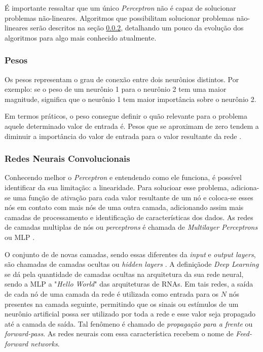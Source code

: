 É importante ressaltar que um único \textit{Perceptron} não é capaz de solucionar problemas não-lineares. Algoritmos que possibilitam solucionar problemas não-lineares serão descritos na seção \ref{sssec:cnn}, detalhando um pouco da evolução dos algoritmos para algo mais conhecido atualmente.

\subsubsection{Pesos}

Os pesos representam o grau de conexão entre dois neurônios distintos. Por exemplo: se o peso de um neurônio 1 para o neurônio 2 tem uma maior magnitude, significa que o neurônio 1 tem maior importância sobre o neurônio 2.

Em termos práticos, o peso consegue definir o quão relevante para o problema aquele determinado valor de entrada é. Pesos que se aproximam de zero tendem a diminuir a importância do valor de entrada para o valor resultante da rede \cite{everything-about-nn}.

\subsubsection{Redes Neurais Convolucionais} \label{sssec:cnn}

Conhecendo melhor o \textit{Perceptron} e entendendo como ele funciona, é possível identificar da sua limitação: a linearidade. Para solucioar esse problema, adiciona-se uma função de ativação para cada valor resultante de um nó e coloca-se esses nós em contato com mais nós de uma outra camada, adicionando assim mais camadas de processamento e identificação de características dos dados. As redes de camadas multiplas de nós ou \textit{perceptrons} é chamada de \textit{Multilayer Perceptrons} ou MLP \cite{deep-learning-book-br}.

O conjunto de de novas camadas, sendo essas diferentes da \textit{input} e \textit{output layers}, são chamadas de camadas ocultas ou \textit{hidden layers} \cite{goodfellow-et-al-2016}. A definiçãode \textit{Deep Learning} se dá pela quantidade de camadas ocultas na arquitetura da sua rede neural, sendo a MLP a "\textit{Hello World}" das arquiteturas de RNAs. Em tais redes, a saída de cada nó de uma camada da rede é utilizada como entrada para os $N$ nós presentes na camada seguinte, permitindo que os sinais ou estímulos de um neurônio artificial possa ser utilizado por toda a rede e esse valor seja propagado até a camada de saída. Tal fenômeno é chamado de \textit{propagação para a frente} ou \textit{forward-pass}. As redes neurais com essa característica recebem o nome de \textit{Feed-forward networks}.
\\

